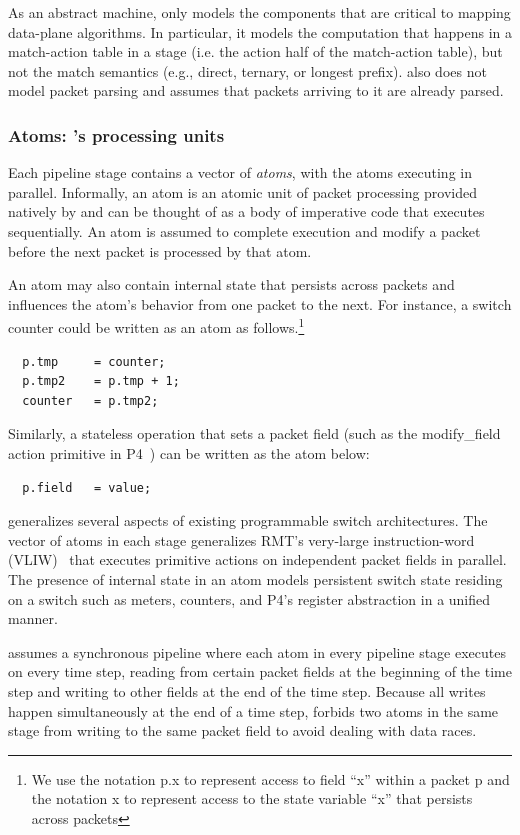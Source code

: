 As an abstract machine, \absmachine only models the components that
are critical to mapping data-plane algorithms. In particular, it
models the computation that happens in a match-action table in a stage
(i.e. the action half of the match-action table), but not the match
semantics (e.g., direct, ternary, or longest prefix). \absmachine also
does not model packet parsing and assumes that packets arriving to it
are already parsed.

\subsubsection{Atoms: \absmachine's processing units}

Each pipeline stage contains a vector of \textit{atoms}, with the atoms
executing in parallel. Informally, an atom is an atomic unit of packet
processing provided natively by \absmachine and can be thought of as a body of
imperative code that executes sequentially. An atom is assumed to complete
execution and modify a packet before the next packet is processed by that atom.

An atom may also contain internal state that persists across packets and
influences the atom's behavior from one packet to the next. For instance, a
switch counter could be written as an atom as follows.\footnote{We use the
  notation p.x to represent access to field ``x'' within a packet p and the
  notation x to represent access to the state variable ``x'' that persists across packets}
\begin{verbatim}
  p.tmp     = counter;
  p.tmp2    = p.tmp + 1;
  counter   = p.tmp2;
\end{verbatim}
Similarly, a stateless operation that sets a packet field (such as the
modify\_field action primitive in P4~\cite{p4spec}) can be written as the atom
below:
\begin{verbatim}
  p.field   = value;
\end{verbatim}

\absmachine generalizes several aspects of existing programmable switch
architectures. The vector of atoms in each stage generalizes RMT's very-large
instruction-word (VLIW)~\cite{rmt} that executes primitive actions on
independent packet fields in parallel. The presence of internal state in an
atom models persistent switch state residing on a switch such as meters,
counters, and P4's register abstraction in a unified manner.

\smallskip
{}
\absmachine assumes a synchronous pipeline where each atom in every pipeline
stage executes on every time step, reading from certain packet fields at the
beginning of the time step and writing to other fields at the end of the time
step. Because all writes happen simultaneously at the end of a time step,
\absmachine forbids two atoms in the same stage from writing to the same
packet field to avoid dealing with data races.


